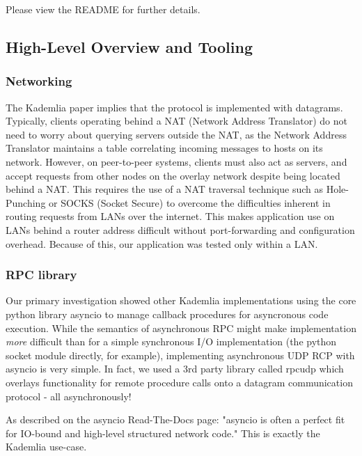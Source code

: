 \documentclass[12pt]{report}
\begin{document}
            Please view the README for further details.
        \subsection{High-Level Overview and Tooling}
            \subsubsection{Networking}
                The Kademlia paper implies that the protocol is implemented
                with datagrams\cite{kademlia}.  Typically, clients operating
                behind a NAT (Network Address Translator) do not need to worry
                about querying servers outside the NAT, as the Network Address
                Translator maintains a table correlating incoming messages to
                hosts on its network.  However, on peer-to-peer systems,
                clients must also act as servers, and accept requests from
                other nodes on the overlay network despite being located behind
                a NAT.  This requires the use of a NAT traversal technique such
                as Hole-Punching or SOCKS (Socket Secure) to overcome the
                difficulties inherent in routing requests from LANs over the
                internet.  This makes application use on LANs behind a router
                address difficult without port-forwarding and configuration
                overhead.  Because of this, our application was tested only
                within a LAN.
            \subsubsection{RPC library}
                Our primary investigation showed other Kademlia
                implementations using the core python library asyncio to manage
                callback procedures for asyncronous code execution. While the
                semantics of asynchronous RPC might make implementation
                \textit{more} difficult than for a simple synchronous I/O
                implementation (the python socket module directly, for
                example), implementing asynchronous UDP RCP with asyncio is
                very simple.  In fact, we used a 3rd party library called
                rpcudp which overlays functionality for remote procedure calls
                onto a datagram communication protocol - all
                asynchronously!\cite{rpcudp}

                As described on the asyncio Read-The-Docs page: "asyncio is
                often a perfect fit for IO-bound and high-level structured
                network code." This is exactly the Kademlia
                use-case.\cite{asyncio}
\end{document}
